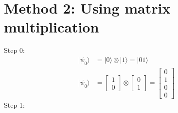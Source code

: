 \documentclass{article}
\begin{document}
\section{Method 2: Using matrix multiplication}
Step 0:
\begin{equation}
\begin{split}
    |\psi_0\rangle & = |0\rangle \otimes |1\rangle = |01\rangle \\
    |\psi_0\rangle & = \begin{bmatrix} 1 \\ 0 \end{bmatrix} \otimes \begin{bmatrix} 0 \\ 1 \end{bmatrix}
    = \begin{bmatrix} 0 \\ 1 \\ 0 \\ 0 \end{bmatrix}
\end{split}
\end{equation}
Step 1:
\end{document}
